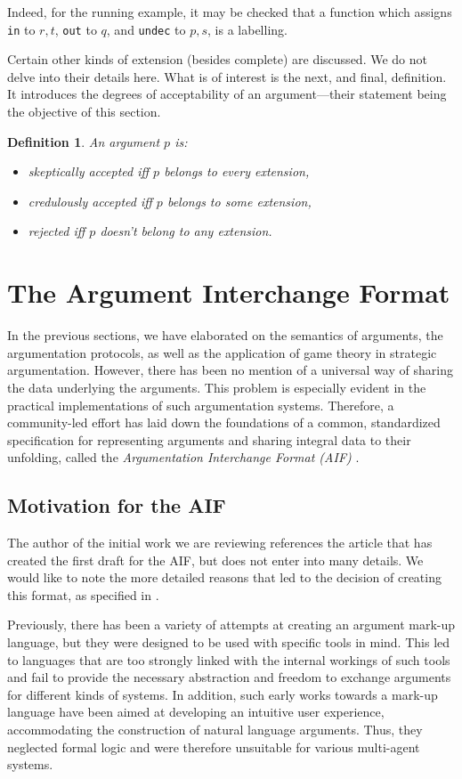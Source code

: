 \documentclass[12pt, a4paper]{article}
\newtheorem{Def}{Definition}[subsection]
\begin{document}
Indeed, for the running example, it may be checked that a function which assigns \texttt{in} to $r, t$, \texttt{out} to $q$, and \texttt{undec} to $p, s$, is a labelling.

Certain other kinds of extension (besides complete) are discussed. We do not delve into their details here. What is of interest is the next, and final, definition. It introduces the degrees of acceptability of an argument---their statement being the objective of this section.

\begin{Def}
An argument $p$ is:
\begin{itemize}
\item \emph{skeptically accepted} iff $p$ belongs to every extension,
\item \emph{credulously accepted} iff $p$ belongs to some extension,
\item \emph{rejected} iff $p$ doesn't belong to any extension.
\end{itemize}
\end{Def}


\section{The Argument Interchange Format}
In the previous sections, we have elaborated on the semantics of arguments, the argumentation protocols, as well as the application of game theory in strategic argumentation. However, there has been no mention of a universal way of sharing the data underlying the arguments. This problem is especially evident in the practical implementations of such argumentation systems. Therefore, a community-led effort has laid down the foundations of a common, standardized specification for representing arguments and sharing integral data to their unfolding, called the \emph{Argumentation Interchange Format (AIF)} \cite{aif}.

\subsection{Motivation for the AIF}
The author of the initial work we are reviewing references the article that has created the first draft for the AIF, but does not enter into many details. We would like to note the more detailed reasons that led to the decision of creating this format, as specified in \cite{aif}. 

Previously, there has been a variety of attempts at creating an argument mark-up language, but they were designed to be used with specific tools in mind. This led to languages that are too strongly linked with the internal workings of such tools and fail to provide the necessary abstraction and freedom to exchange arguments for different kinds of systems. In addition, such early works towards a mark-up language have been aimed at developing an intuitive user experience, accommodating the construction of natural language arguments. Thus, they neglected formal logic and were therefore unsuitable for various multi-agent systems.
\end{document}
